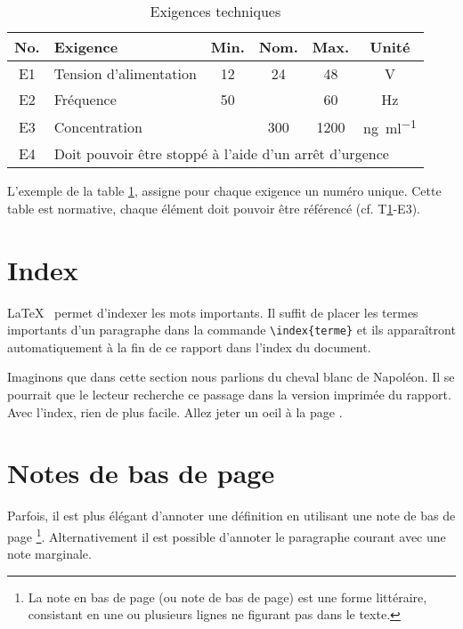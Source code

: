 \documentclass[
    iai, %
    eai, %
    confidential, %
]{heig-tb}
\begin{document}
\begin{table}[h]
\begin{center}
    \caption{Exigences techniques \label{specification}}
    \begin{tabularx}{\textwidth}{cXcccc}
    No. & Exigence & Min. & Nom. & Max. & Unité \\ \toprule
    E1 & Tension d'alimentation & 12 & 24 & 48 & \si{\volt} \\ \midrule
    E2 & Fréquence & 50 &  & 60 & \si{\hertz} \\ \midrule
    E3 & Concentration & & 300 & 1200 & \si{\nano\gram\per\milli\litre} \\ \midrule
    E4 & \multicolumn{5}{l}{Doit pouvoir être stoppé à l'aide d'un arrêt d'urgence}
    \end{tabularx}
\end{center}
\end{table}

L'exemple de la table \ref{specification}, assigne pour chaque exigence un numéro unique. Cette table est normative, chaque élément doit pouvoir être référencé (cf. T\ref{specification}-E3).

\section{Index}
\LaTeX~ permet d'indexer les mots  importants. Il suffit de placer les termes importants d'un paragraphe dans la commande \texttt{\textbackslash index\{terme\}} et ils apparaîtront automatiquement à la fin de ce rapport dans l'index du document.


Imaginons que dans cette section nous parlions du cheval blanc  de Napoléon. Il se pourrait que le lecteur recherche ce passage dans la version imprimée du rapport. Avec l'index, rien de plus facile. Allez jeter un oeil à la page \pageref{index}.

\section{Notes de bas de page}

Parfois, il est plus élégant d'annoter une définition en utilisant une note de bas de page \footnote{La note en bas de page (ou note de bas de page) est une forme littéraire, consistant en une ou plusieurs lignes ne figurant pas dans le texte.}. Alternativement il est possible d'annoter le paragraphe courant avec une note marginale. 
\end{document}

